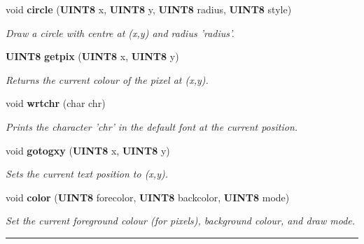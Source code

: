 \begin{CompactItemize}
\item 
void {\bf circle} ({\bf UINT8} x, {\bf UINT8} y, {\bf UINT8} radius, {\bf UINT8} style)
\begin{CompactList}\small\item\em Draw a circle with centre at (x,y) and radius 'radius'.\item\end{CompactList}

\item 
\label{drawing.h_a25}
{\bf UINT8} {\bf getpix} ({\bf UINT8} x, {\bf UINT8} y)
\begin{CompactList}\small\item\em Returns the current colour of the pixel at (x,y).\item\end{CompactList}

\item 
\label{drawing.h_a26}
void {\bf wrtchr} (char chr)
\begin{CompactList}\small\item\em Prints the character 'chr' in the default font at the current position.\item\end{CompactList}

\item 
void {\bf gotogxy} ({\bf UINT8} x, {\bf UINT8} y)
\begin{CompactList}\small\item\em Sets the current text position to (x,y).\item\end{CompactList}

\item 
\label{drawing.h_a28}
void {\bf color} ({\bf UINT8} forecolor, {\bf UINT8} backcolor, {\bf UINT8} mode)
\begin{CompactList}\small\item\em Set the current foreground colour (for pixels), background colour, and draw mode.\item\end{CompactList}

\end{CompactItemize}
\vspace{0.4cm}\hrule\vspace{0.2cm}
